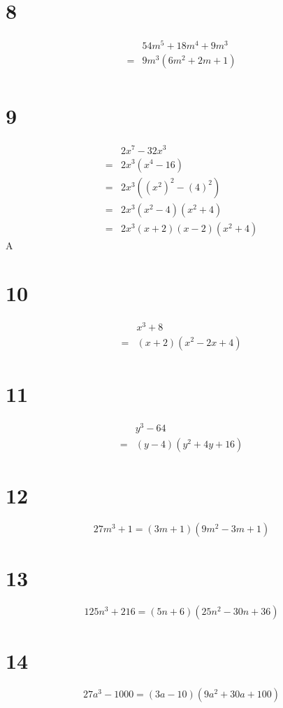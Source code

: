 \documentclass{article}
\theoremstyle{definition}
\begin{document}
\section*{8}
\[
\begin{array}{rl}
	& 54m^5+18m^4+9m^3 \\
=	& 9m^3(6m^2+2m+1) \\
\end{array}
\]

\section*{9}
\[
\begin{array}{rl}
	& 2x^7-32x^3 \\
=	& 2x^3(x^4-16) \\
=	& 2x^3((x^2)^2-(4)^2) \\
=	& 2x^3(x^2-4)(x^2+4) \\
=	& 2x^3(x+2)(x-2)(x^2+4)
\end{array}
\]
A

\section*{10}
\[
\begin{array}{rl}
	& x^3+8 \\
=	& (x+2)(x^2-2x+4)
\end{array}
\]

\section*{11}
\[
\begin{array}{rl}
	& y^3-64 \\
=	& (y-4)(y^2+4y+16)
\end{array}
\]

\section*{12}
\[ 27m^3+1=(3m+1)(9m^2-3m+1) \]

\section*{13}
\[ 125n^3+216=(5n+6)(25n^2-30n+36) \]

\section*{14}
\[ 27a^3-1000=(3a-10)(9a^2+30a+100) \]
\end{document}
